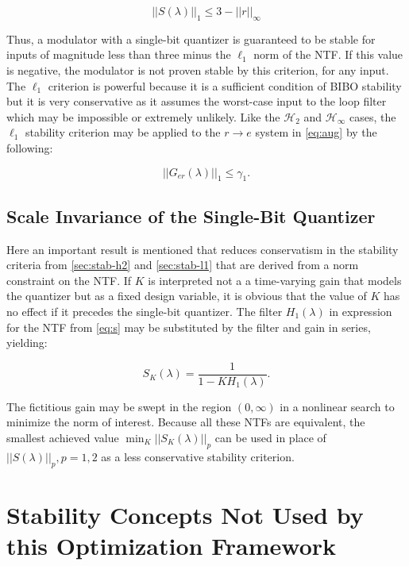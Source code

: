 \begin{equation} 
	 ||S(\lambda)||_1 \leq 3 - ||r||_\infty \label{eq:l1-bound5}
\end{equation}

Thus, a modulator with a single-bit quantizer is guaranteed to be stable for inputs of magnitude less than three minus the $\ell_1$ norm of the NTF. If this value is negative, the modulator is not proven stable by this criterion, for any input. The $\ell_1$ criterion is powerful because it is a sufficient condition of \gls{BIBO} stability but it is very conservative as it assumes the worst-case input to the loop filter which may be impossible or extremely unlikely. Like the $\mathcal{H}_2$ and $\mathcal{H}_\infty$ cases, the $\ell_1$ stability criterion may be applied to the $r \rightarrow e$ system in \autoref{eq:aug} by the following:

\begin{equation}
	||G_{er}(\lambda)||_1 \leq \gamma_1. \label{eq:l1}
\end{equation}

\subsection{Scale Invariance of the Single-Bit Quantizer}

Here an important result is mentioned that reduces conservatism in the stability criteria from \autoref{sec:stab-h2} and \autoref{sec:stab-l1} that are derived from a norm constraint on the \gls{NTF}. If $K$ is interpreted not a a time-varying gain that models the quantizer but as a fixed design variable, it is obvious that the value of $K$ has no effect if it precedes the single-bit quantizer. The filter $H_1(\lambda)$ in expression for the \gls{NTF} from \autoref{eq:s} may be substituted by the filter and gain in series, yielding:

\begin{equation}
	S_K(\lambda) = \frac{1}{1 - KH_1(\lambda)}. \label{eq:scale-invariance}
\end{equation}

The fictitious gain may be swept in the region $(0, \infty)$ in a nonlinear search to minimize the norm of interest. Because all these \gls{NTF}s are equivalent, the smallest achieved value $\min_K ||S_K(\lambda)||_p$ can be used in place of $||S(\lambda)||_p, p = 1, 2$ as a less conservative stability criterion.

\section{Stability Concepts Not Used by this Optimization Framework}
\label{sec:stab-notused}

